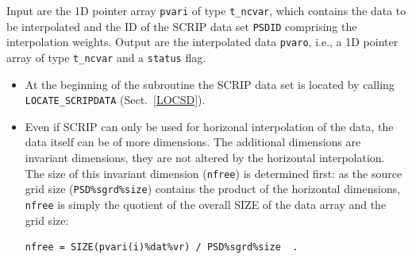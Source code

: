 \documentclass[11pt,twoside]{article}
\begin{document}
Input are the 1D pointer array \verb|pvari| of type \verb|t_ncvar|, which
contains the data to be interpolated and the ID of the SCRIP data
set \verb|PSDID| comprising the interpolation weights. Output are 
the interpolated data \verb|pvaro|, i.e.,  a 1D pointer array 
 of type \verb|t_ncvar| and a \verb|status| flag.
\begin{itemize}
\item At the beginning of the subroutine the SCRIP data set is located by
calling \verb|LOCATE_SCRIPDATA| (Sect.~\ref{LOCSD}).

\item Even if SCRIP can only be used for horizonal interpolation of the
data, the data itself can be of more dimensions. The additional
dimensions are invariant dimensions, they are not altered
by the horizontal interpolation. The size of this invariant
dimension (\verb|nfree|) is determined first: as the source grid
size (\verb|PSD%sgrd%size|) contains the product of the horizontal
dimensions, \verb|nfree| is simply the quotient of the overall SIZE of the
data array and the grid size:
\begin{verbatim}
nfree = SIZE(pvari(i)%dat%vr) / PSD%sgrd%size  .
\end{verbatim}


\end{itemize}
\end{document}
